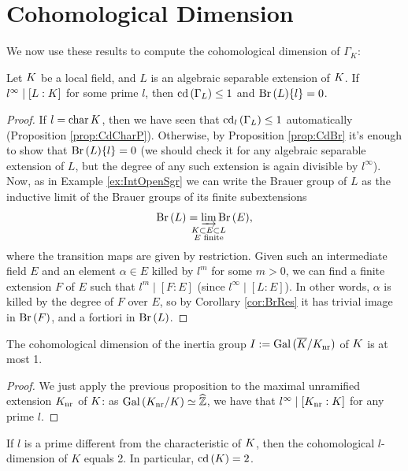 \documentclass[a4paper, oneside]{memoir}
\begin{document}
\section{Cohomological Dimension}

We now use these results to compute the cohomological dimension of $\Gamma_K$:

\begin{proposition}
	Let $K$ be a local field, and $L$ is an algebraic separable extension of $K$. If $l^\infty \mid [L:K]$ for some prime $l$, then $\operatorname{cd}{(\Gamma_L)}\leq 1$ and $\operatorname{Br}{(L)}\{l\}=0$.
\end{proposition}

\begin{proof}
	If $l = \operatorname{char}{K}$, then we have seen that $\operatorname{cd}_l{(\Gamma_L)}\leq 1$ automatically (Proposition \ref{prop:CdCharP}).
	Otherwise, by Proposition \ref{prop:CdBr} it's enough to show that $\operatorname{Br}{(L)}\{l\}=0$ (we should check it for any algebraic separable extension of $L$, but the degree of any such
	extension is again divisible by $l^\infty$).
	Now, as in Example \ref{ex:IntOpenSgr} we can write the Brauer group of $L$ as the inductive limit of the Brauer groups of its finite subextensions
	\[
		\Br{L}=\varinjlim_{\mathclap{\substack{\K\subset E\subset L \\ E\text{ finite}}}}{\Br{E}},
	\]
	where the transition maps are given by restriction.
	Given such an intermediate field $E$ and an element $\alpha\in E$ killed by $l^m$ for some $m>0$, we can find a finite extension $F$ of $E$ such that $l^m\mid [F:E]$ (since
	$l^\infty\mid [L:E]$). In other words, $\alpha$ is killed by the degree of $F$ over $E$, so by Corollary \ref{cor:BrRes} it has trivial image in $\operatorname{Br}{(F)}$, and a fortiori in $\operatorname{Br}{(L)}$.

\end{proof}

\begin{corollary}
	The cohomological dimension of the inertia group $I:=\operatorname{Gal}{(\overline{K}/K_{\text{nr}})}$ of $K$ is at most 1.
\end{corollary}

\begin{proof}
	We just apply the previous proposition to the maximal unramified extension $K_{\text{nr}}$ of $K$: as $\operatorname{Gal}{(K_{\text{nr}}/K)}\simeq\widehat{\mathbb{Z}}$, we have that
	$l^\infty\mid [K_{\text{nr}}:K]$ for any prime $l$.
\end{proof}

\begin{theorem}\label{thm:CohomFin}
	If $l$ is a prime different from the characteristic of $K$, then the cohomological $l$-dimension of $K$ equals 2. In particular, $\operatorname{cd}{(K)}=2$.
\end{theorem}
\end{document}
